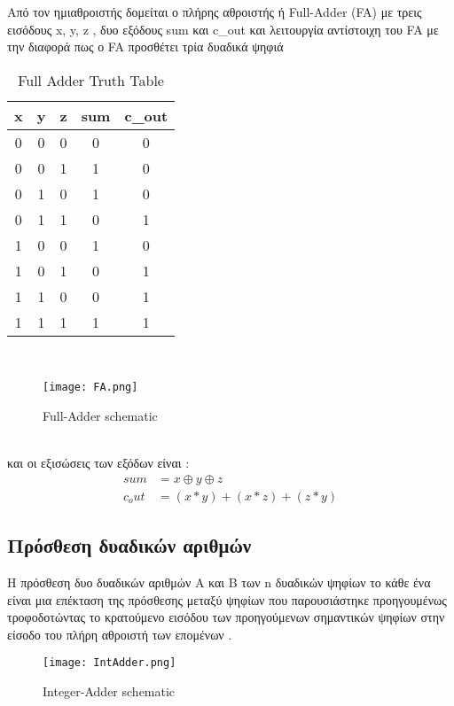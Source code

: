 Από τον ημιαθροιστής δομείται ο πλήρης αθροιστής ή Full-Adder (FA) με τρεις εισόδους x, y, z , δυο εξόδους sum και c\_out και λειτουργία αντίστοιχη του FA με την διαφορά πως ο FA προσθέτει τρία δυαδικά ψηφιά \\
\begin{table}[ht]
\centering
 \begin{tabular}{||c c c | c c||} 
 \hline
 x & y & z & sum & c\_out \\ [0.5ex] 
 \hline\hline
 0 & 0 & 0 & 0 & 0 \\ 
 \hline
 0 & 0 & 1 & 1 & 0 \\
 \hline
 0 & 1 & 0 & 1 & 0 \\
 \hline
 0 & 1 & 1 & 0 & 1 \\
 \hline
 1 & 0 & 0 & 1 & 0 \\ 
 \hline
 1 & 0 & 1 & 0 & 1 \\
 \hline
 1 & 1 & 0 & 0 & 1 \\
 \hline
 1 & 1 & 1 & 1 & 1 \\
 \hline
\end{tabular}
\caption{Full Adder Truth Table}
\label{table:2}
\end{table}
\\
\begin{figure}[ht]
\centering
\texttt{[image: FA.png]}
\caption{Full-Adder schematic}
\label{FASchematic}
\end{figure}
\\
και οι εξισώσεις των εξόδων είναι :
\\
\begin{equation}
\begin{split}
    sum &= x \oplus y \oplus z \\
    c_out &= ( x * y ) + ( x * z ) + ( z * y )
\end{split}
\end{equation}

\clearpage


% 
\subsection{Πρόσθεση δυαδικών αριθμών}

Η πρόσθεση δυο δυαδικών αριθμών A και Β των n δυαδικών ψηφίων το κάθε ένα είναι 
μια επέκταση της πρόσθεσης μεταξύ ψηφίων που παρουσιάστηκε προηγουμένως τροφοδοτώντας 
το κρατούμενο εισόδου των προηγούμενων σημαντικών ψηφίων στην είσοδο του πλήρη αθροιστή 
των επομένων .
\\
\begin{figure}[ht]
\centering
\texttt{[image: IntAdder.png]}
\caption{Integer-Adder schematic}
\label{IntegerAdderSchematic}
\end{figure}
\\



